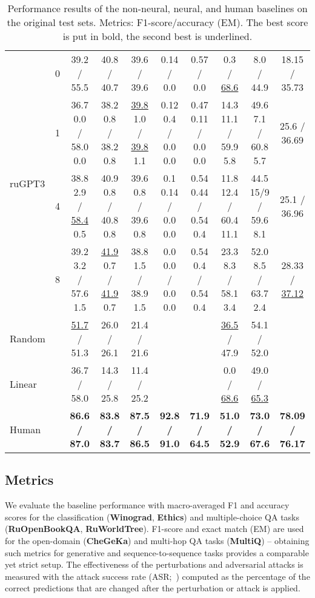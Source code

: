 \documentclass[11pt]{article}
\newcommand{\xmark}{\ding{55}}\newcommand{\cmark}{\ding{51}}
\begin{document}
\begin{table*}[!ht]
{\begin{tabular}{lccccccccc}
    \midrule
    \multirow{4}{*}{ruGPT3} 
        & 0 & 39.2 / 55.5 & 40.8 / 40.7 & 39.6 / 39.6 & 0.14 / 0.0 & 0.57 / 0.0 & 0.3 / \underline{68.6} & 8.0 / 44.9 & 18.15 / 35.73 \\
        & 1 & 36.7 {\tiny0.0} / 58.0 {\tiny0.0} & 38.2 {\tiny0.8} / 38.2 {\tiny0.8} & \underline{39.8} {\tiny1.0} / \underline{39.8} {\tiny1.1} & 0.12 {\tiny0.4} / 0.0 {\tiny0.0} & 0.47 {\tiny0.11} / 0.0 {\tiny0.0} & 14.3 {\tiny11.1} / 59.9 {\tiny5.8} & 49.6 {\tiny7.1} / 60.8 {\tiny5.7} & 25.6 / 36.69\\
        & 4 & 38.8 {\tiny2.9} / \underline{58.4} {\tiny0.5} & 40.9 {\tiny0.8} / 40.8 {\tiny0.8} & 39.6 {\tiny0.8} / 39.6 {\tiny0.8} & 0.1 {\tiny0.14} / 0.0 {\tiny0.0} & 0.54 {\tiny0.44} / 0.54 {\tiny0.4} & 11.8 {\tiny12.4} / 60.4 {\tiny11.1} & 44.5 {\tiny15/9} / 59.6 {\tiny8.1} & 25.1 / 36.96\\
        & 8 & 39.2 {\tiny3.2} / 57.6 {\tiny1.5} & \underline{41.9} {\tiny0.7} / \underline{41.9} {\tiny0.7} & 38.8 {\tiny1.5} / 38.9 {\tiny1.5} & 0.0 {\tiny0.0} / 0.0 {\tiny0.0} & 0.54 {\tiny0.4} / 0.54 {\tiny0.4} & 23.3 {\tiny8.3} / 58.1 {\tiny3.4} & 52.0 {\tiny8.5} / 63.7 {\tiny2.4} & 28.33 / \underline{37.12} \\
    \midrule
    Random 
        & \xmark & \underline{51.7} / 51.3 & 26.0 / 26.1 & 21.4 / 21.6 & \xmark & \xmark & \underline{36.5} / 47.9 & 54.1 / 52.0 & \xmark \\ Linear
        & \xmark & 36.7 / 58.0 & 14.3 / 25.8 & 11.4 / 25.2 & \xmark & \xmark & 0.0 / \underline{68.6}  & 49.0 / \underline{65.3} & \xmark \\ Human 
        & \xmark & \bf 86.6 / 87.0 & \bf 83.8 / 83.7 & \bf 87.5 / 86.5 & \bf 92.8 / 91.0 &   \bf 71.9 / 64.5 & \bf 51.0 / 52.9 & \bf 73.0 / 67.6 & \bf 78.09 / 76.17 \\
    \bottomrule
    \end{tabular}}
    \caption{Performance results of the non-neural, neural, and human baselines on the original test sets. Metrics: F1-score/accuracy (EM). The best score is put in bold, the second best is underlined.}
    \label{tab:eval_sets_results}
\end{table*} \subsection{Metrics} 
We evaluate the baseline performance with macro-averaged F1 and accuracy scores for the classification (\textbf{Winograd}, \textbf{Ethics}) and multiple-choice QA tasks (\textbf{RuOpenBookQA}, \textbf{RuWorldTree}). F1-score and exact match (EM) are used for the open-domain (\textbf{CheGeKa}) and multi-hop QA tasks (\textbf{MultiQ}) -- obtaining such metrics for generative and sequence-to-sequence tasks provides a comparable yet strict setup. The effectiveness of the perturbations and adversarial attacks is measured with the attack success rate (ASR;~\citealp{wang2021adversarial}) computed as the percentage of the correct predictions that are changed after the perturbation or attack is applied.
 
\end{document}
